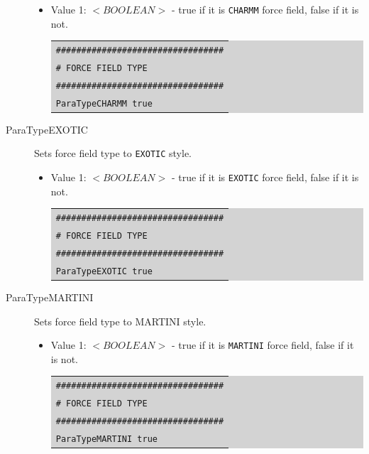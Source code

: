 \begin{description}
	\begin{itemize}
	\item Value 1: $<BOOLEAN>$ - true if it is \texttt{CHARMM} force field, false if it is not.\\
	\colorbox{lightgray}{
	\begin{tabular}{l}
	\texttt{\#\#\#\#\#\#\#\#\#\#\#\#\#\#\#\#\#\#\#\#\#\#\#\#\#\#\#\#\#\#\#\#\#}\\
	\texttt{\# FORCE FIELD TYPE}\\
	\texttt{\#\#\#\#\#\#\#\#\#\#\#\#\#\#\#\#\#\#\#\#\#\#\#\#\#\#\#\#\#\#\#\#\#}\\
	\texttt{ParaTypeCHARMM true}\\
	\end{tabular}}
	\end{itemize}
\item [ParaTypeEXOTIC] Sets force field type to \texttt{EXOTIC} style.
	\begin{itemize}	
	\item Value 1: $<BOOLEAN>$ - true if it is \texttt{EXOTIC} force field, false if it is not.\\
	\colorbox{lightgray}{
	\begin{tabular}{l}
	\texttt{\#\#\#\#\#\#\#\#\#\#\#\#\#\#\#\#\#\#\#\#\#\#\#\#\#\#\#\#\#\#\#\#\#}\\
	\texttt{\# FORCE FIELD TYPE}\\
	\texttt{\#\#\#\#\#\#\#\#\#\#\#\#\#\#\#\#\#\#\#\#\#\#\#\#\#\#\#\#\#\#\#\#\#}\\
	\texttt{ParaTypeEXOTIC true}\\
	\end{tabular}}
	\end{itemize}
\item [ParaTypeMARTINI] Sets force field type to MARTINI style.
	\begin{itemize}	
	\item Value 1: $<BOOLEAN>$ - true if it is \texttt{MARTINI} force field, false if it is not.\\
	\colorbox{lightgray}{
	\begin{tabular}{l}
	\texttt{\#\#\#\#\#\#\#\#\#\#\#\#\#\#\#\#\#\#\#\#\#\#\#\#\#\#\#\#\#\#\#\#\#}\\
	\texttt{\# FORCE FIELD TYPE}\\
	\texttt{\#\#\#\#\#\#\#\#\#\#\#\#\#\#\#\#\#\#\#\#\#\#\#\#\#\#\#\#\#\#\#\#\#}\\
	\texttt{ParaTypeMARTINI true}\\
	\end{tabular}}
	\end{itemize}

\end{description}
